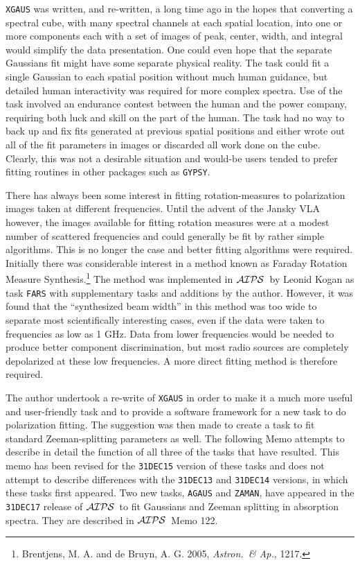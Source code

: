 \documentclass[twoside]{article}
\newcommand{\Me}[1]{\textcolor{mecol}{#1}}
\newcommand{\AIPS}{{$\cal AIPS\/$}}
\newcommand{\keyw}[1]{\hbox{{\tt #1}}}
\begin{document}
{\tt XGAUS} was written, and re-written, a long time ago in the hopes
that converting a spectral cube, with many spectral channels at each
spatial location, into one or more components each with a set of
images of peak, center, width, and integral would simplify the data
presentation.  One could even hope that the separate Gaussians fit
might have some separate physical reality.  The task could fit a
single Gaussian to each spatial position without much human guidance,
but detailed human interactivity was required for more complex
spectra.  Use of the task involved an endurance contest between the
human and the power company, requiring both luck and skill on the part
of the human. The task had no way to back up and fix fits generated at
previous spatial positions and either wrote out all of the fit
parameters in images or discarded all work done on the cube.  Clearly,
this was not a desirable situation and would-be users tended to prefer
fitting routines in other packages such as {\tt GYPSY}\@.

There has always been some interest in fitting rotation-measures to
polarization images taken at different frequencies.  Until the advent
of the Jansky VLA however, the images available for fitting rotation
measures were at a modest number of scattered frequencies and could
generally be fit by rather simple algorithms.  This is no longer the
case and better fitting algorithms were required.  Initially there was
considerable interest in a method known as Faraday Rotation Measure
Synthesis.\footnote{Brentjens, M. A. and de Bruyn, A. G. 2005, {\it
Astron.\ \& Ap.}, 1217.}  The method was implemented in \AIPS\ by
Leonid Kogan as task \keyw{FARS} with supplementary tasks and
additions by the author.  However, it was found that the ``synthesized
beam width'' in this method was too wide to separate most
scientifically interesting cases, even if the data were taken to
frequencies as low as 1 GHz.  Data from lower frequencies would be
needed to produce better component discrimination, but most radio
sources are completely depolarized at these low frequencies.  A more
direct fitting method is therefore required.

The author undertook a re-write of \keyw{XGAUS} in order to make it a
much more useful and user-friendly task and to provide a software
framework for a new task to do polarization fitting.  The suggestion
was then made to create a task to fit standard Zeeman-splitting
parameters as well.  The following Memo attempts to describe in detail
the function of all three of the tasks that have resulted.  This memo
\Me{has been revised for the {\tt 31DEC15}} version of these tasks and
does not attempt to describe differences with the {\tt 31DEC13}
\Me{and {\tt 31DEC14} versions}, in which these tasks first appeared.
\Me{Two new tasks, {\tt AGAUS} and {\tt ZAMAN}, have appeared in the
  {\tt 31DEC17} release of \AIPS\ to fit Gaussians and Zeeman
  splitting in absorption spectra.  They are described in \AIPS\ Memo
  122.}
\end{document}
